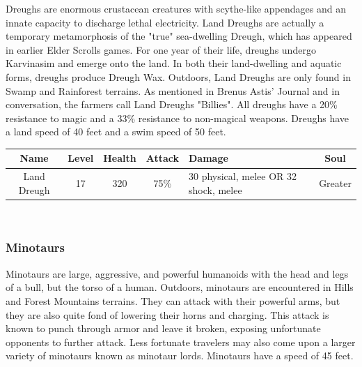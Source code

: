 \documentclass[12pt]{book}
\begin{document}
Dreughs are enormous crustacean creatures with scythe-like appendages and an innate capacity to discharge lethal electricity. Land Dreughs are actually a temporary metamorphosis of the "true" sea-dwelling Dreugh, which has appeared in earlier Elder Scrolls games. For one year of their life, dreughs undergo Karvinasim and emerge onto the land. In both their land-dwelling and aquatic forms, dreughs produce Dreugh Wax. Outdoors, Land Dreughs are only found in Swamp and Rainforest terrains. As mentioned in Brenus Astis' Journal and in conversation, the farmers call Land Dreughs "Billies". All dreughs have a 20\% resistance to magic and a 33\% resistance to non-magical weapons. Dreughs have a land speed of 40 feet and a swim speed of 50 feet.

\begin{tabular}{|c|c|c|c|p{}|c|}
\hline
Name & Level & Health & Attack & Damage & Soul\\ \hline
Land Dreugh & 17 & 320 & 75\% & 30 physical, melee OR 32 shock, melee & Greater\\ \hline
\end{tabular}\\

\subsubsection{Minotaurs}
Minotaurs are large, aggressive, and powerful humanoids with the head and legs of a bull, but the torso of a human. Outdoors, minotaurs are encountered in Hills and Forest Mountains terrains. They can attack with their powerful arms, but they are also quite fond of lowering their horns and charging. This attack is known to punch through armor and leave it broken, exposing unfortunate opponents to further attack. Less fortunate travelers may also come upon a larger variety of minotaurs known as minotaur lords. Minotaurs have a speed of 45 feet.
\end{document}
